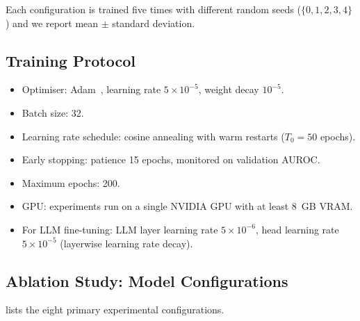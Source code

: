 Each configuration is trained five times with different random seeds
($\{0,1,2,3,4\}$) and we report mean $\pm$ standard deviation.

\subsection{Training Protocol}

\begin{itemize}[noitemsep]
  \item Optimiser: Adam~\cite{adam}, learning rate $5 \times 10^{-5}$, weight decay $10^{-5}$.
  \item Batch size: 32.
  \item Learning rate schedule: cosine annealing with warm restarts ($T_0 = 50$ epochs).
  \item Early stopping: patience 15 epochs, monitored on validation AUROC.
  \item Maximum epochs: 200.
  \item GPU: experiments run on a single NVIDIA GPU with at least 8~GB VRAM.
  \item For LLM fine-tuning: LLM layer learning rate $5 \times 10^{-6}$,
        head learning rate $5 \times 10^{-5}$ (layerwise learning rate decay).
\end{itemize}

\subsection{Ablation Study: Model Configurations}

 lists the eight primary experimental configurations.

